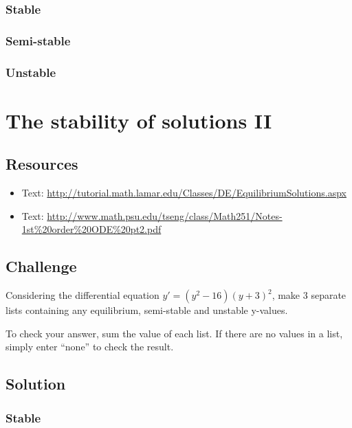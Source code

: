 \subsubsection*{Stable}

\subsubsection*{Semi-stable}

\subsubsection*{Unstable}




\newpage
\section{The stability of solutions II}

\subsection*{Resources}
\begin{itemize}
    \item Text: \url{http://tutorial.math.lamar.edu/Classes/DE/EquilibriumSolutions.aspx}
    \item Text: \url{http://www.math.psu.edu/tseng/class/Math251/Notes-1st\%20order\%20ODE\%20pt2.pdf}
\end{itemize}

\subsection*{Challenge}
Considering the differential equation $y'=(y^2-16)(y+3)^2$, make 3 separate lists containing any equilibrium, semi-stable and unstable y-values.

To check your answer, sum the value of each list. If there are no values in a list, simply enter ``none'' to check the result.

\subsection*{Solution}
\subsubsection*{Stable}

